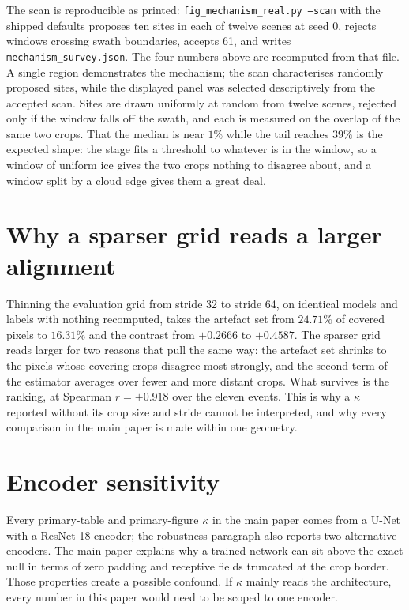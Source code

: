 \documentclass[10pt,twocolumn,letterpaper]{article}
\newcommand{\kap}{\kappa}
\begin{document}
The scan is reproducible as printed: \texttt{fig\_mechanism\_real.py --scan}
with the shipped defaults proposes ten sites in each of twelve scenes at seed 0,
rejects windows crossing swath boundaries, accepts 61, and writes
\texttt{mechanism\_survey.json}. The four numbers above are recomputed from that
file. A single region demonstrates the mechanism; the scan characterises randomly
proposed sites, while the
displayed panel was selected descriptively from the accepted scan. Sites are drawn
uniformly at random from twelve scenes, rejected only if
the window falls off the swath, and each is measured on the overlap of the same
two crops. That the median is near $1\%$ while the tail reaches $39\%$ is the
expected shape: the stage fits a threshold to whatever is in the window, so a
window of uniform ice gives the two crops nothing to disagree about, and a window
split by a cloud edge gives them a great deal.

\section{Why a sparser grid reads a larger alignment}

Thinning the evaluation grid from stride 32 to stride 64, on identical models and
labels with nothing recomputed, takes the artefact set from $24.71\%$ of covered
pixels to $16.31\%$ and the contrast from $+0.2666$ to $+0.4587$. The sparser grid
reads larger for two reasons that pull the same way: the artefact set shrinks to the
pixels whose covering crops disagree most strongly, and the second term of the
estimator averages over fewer and more distant crops. What survives is the
ranking, at Spearman $r = +0.918$ over the eleven events. This is why a $\kap$
reported without its crop size and stride cannot be interpreted, and why every
comparison in the main paper is made within one geometry.

\section{Encoder sensitivity}

Every primary-table and primary-figure $\kap$ in the main paper comes from a U-Net
with a ResNet-18 encoder; the robustness paragraph also reports two alternative
encoders. The main paper explains why a trained network can sit above the exact null
in terms of zero padding and receptive fields truncated at the crop border. Those
properties create a possible confound. If $\kap$ mainly reads the architecture,
every number in this paper would need to be scoped to one encoder.
\end{document}
